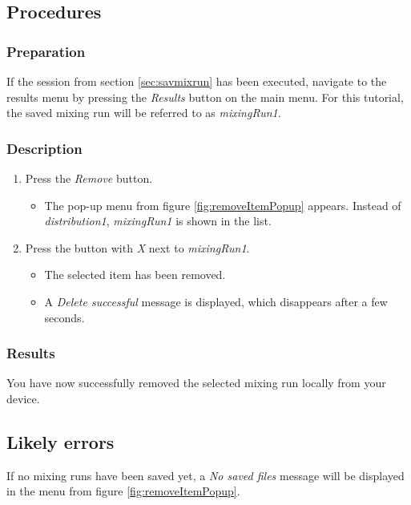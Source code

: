 \subsection{Procedures}

\subsubsection{Preparation}
If the session from section \ref{sec:savmixrun} has been executed, navigate to the results menu by pressing the \emph{Results} button on the main menu.
For this tutorial, the saved mixing run will be referred to as \emph{mixingRun1}.

\subsubsection{Description}
\begin{enumerate}
	\item Press the \emph{Remove} button.
		\begin{itemize}
			\item The pop-up menu from figure \ref{fig:removeItemPopup} appears. Instead of \emph{distribution1}, \emph{mixingRun1} is shown in the list.
		\end{itemize}
	\item Press the button with \emph{X} next to \emph{mixingRun1}.
		\begin{itemize}
			\item The selected item has been removed.
			\item A \emph{Delete successful} message is displayed, which disappears after a few seconds.
		\end{itemize}
\end{enumerate}

\subsubsection{Results}
You have now successfully removed the selected mixing run locally from your device.

\subsection{Likely errors}
If no mixing runs have been saved yet, a \emph{No saved files} message will be displayed in the menu from figure \ref{fig:removeItemPopup}.


